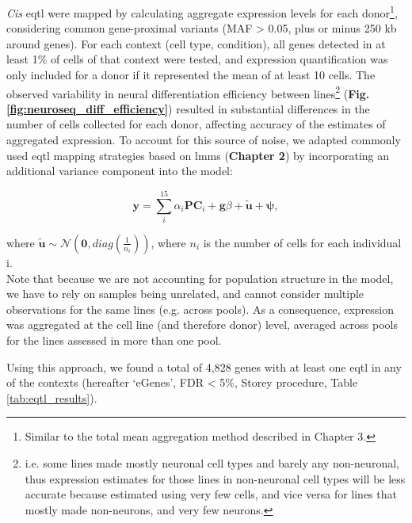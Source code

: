\textit{Cis} \gls{eqtl} were mapped by calculating aggregate expression levels for each donor\footnote{Similar to the total mean aggregation method described in Chapter 3.}, considering common gene-proximal variants (MAF > 0.05, plus or minus 250 kb around genes). 
For
each context (cell type, condition), all genes detected in at least 1\% of cells of that context
were tested, and expression quantification was only included for a donor if it represented
the mean of at least 10 cells.
The observed variability in neural differentiation efficiency between lines\footnote{i.e. some lines made mostly neuronal cell types and barely any non-neuronal, thus expression estimates for those lines in non-neuronal cell types will be less accurate because estimated using very few cells, and vice versa for lines that mostly made non-neurons, and very few neurons.} (\textbf{Fig. \ref{fig:neuroseq_diff_efficiency}}) resulted in substantial differences in the number of cells collected for each donor, affecting accuracy of the estimates of aggregated expression. 
To account for this source of noise, we adapted commonly used \gls{eqtl} mapping strategies \cite{cuomo2020single} based on \glspl{lmm} (\textbf{Chapter
2}) by incorporating an additional variance component into the model:

\begin{equation}\label{eq:neuroseq_ncell}
    \mathbf{y} = \sum_i^{15}\alpha_i \mathbf{PC}_i + \mathbf{g}\beta + \tilde{\mathbf{u}} + \boldsymbol{\psi}, 
\end{equation}

where $\tilde{\mathbf{u}} \sim \mathcal{N}(\mathbf{0}, diag(\frac{1}{n_i}))$, where $n_i$ is the number of cells for each individual i.\\

Note that because we are not accounting for population structure 
in the model, we have to rely on samples being unrelated, and cannot consider multiple observations for the same lines (e.g. across pools). 
As a consequence, expression was aggregated at the cell line (and therefore donor) level, averaged across pools for the lines assessed in more than one pool. 

\newpage

Using this approach, we found
a total of 4,828 genes with at least one \gls{eqtl} in any of the contexts (hereafter `eGenes', FDR < 5\%, Storey procedure, Table \ref{tab:eqtl_results}).

